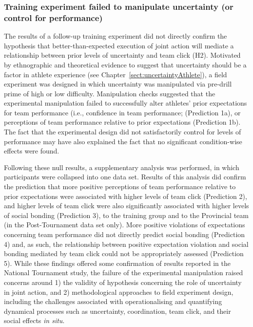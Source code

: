 \subsubsection{Training experiment failed to manipulate uncertainty (or control for performance)}
The results of a follow-up training experiment did not directly confirm the hypothesis that better-than-expected execution of joint action will mediate a relationship between prior levels of uncertainty and team click (H2).  Motivated by ethnographic and theoretical evidence to suggest that uncertainty should be a factor in athlete experience (see Chapter~\ref{sect:uncertaintyAthlete}), a field experiment was designed in which uncertainty was manipulated via pre-drill prime of high or low difficulty.  Manipulation checks suggested that the experimental manipulation failed to successfully alter athletes' prior expectations for team performance (i.e., confidence in team performance; (Prediction 1a), or perceptions of team performance relative to prior expectations (Prediction 1b).  The fact that the experimental design did not satisfactorily control for levels of performance may have also explained the fact that no significant condition-wise effects were found.

Following these null results, a supplementary analysis was performed, in which participants were collapsed into one data set.  Results of this analysis did confirm the prediction that more positive perceptions of team performance relative to prior expectations were associated with higher levels of team click (Prediction 2), and higher levels of team click were also significantly associated with higher levels of social bonding (Prediction 3), to the training group and to the Provincial team (in the Post-Tournament data set only).  More positive violations of expectations concerning team performance did not directly predict social bonding (Prediction 4) and, as such, the relationship between positive expectation violation and social bonding mediated by team click could not be appropriately assessed (Prediction 5).  While these findings offered some confirmation of results reported in the National Tournament study, the failure of the experimental manipulation raised concerns around 1) the validity of hypothesis concerning the role of uncertainty in joint action, and 2) methodological approaches to field experiment design, including the challenges associated with operationalising and quantifying dynamical processes such as uncertainty, coordination, team click, and their social effects \textit{in situ}.

